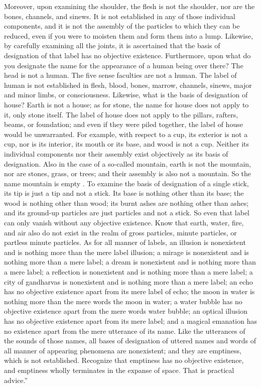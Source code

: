 \documentclass[a4paper,11pt,twoside,final]{book}
\begin{document}
Moreover, upon examining the shoulder, the flesh is not the shoulder,
nor are the bones, channels, and sinews. It is not established in any
of those individual components, and it is not the assembly of the
particles to which they can be reduced, even if you were to moisten
them and form them into a lump. Likewise, by carefully examining all
the joints, it is ascertained that the basis of designation of that
label has no objective existence.  Furthermore, upon what do you
designate the name for the appearance of a human being over there? The
head is not a human. The five sense faculties are not a human. The
label of human is not established in flesh, blood, bones, marrow,
channels, sinews, major and minor limbs, or consciousness. Likewise,
what is the basis of designation of house? Earth is not a house; as
for stone, the name for house does not apply to it, only stone
itself. The label of house does not apply to the pillars, rafters,
beams, or foundation; and even if they were piled together, the label
of house would be unwarranted. For example, with respect to a cup, its
exterior is not a cup, nor is its interior, its mouth or its base, and
wood is not a cup. Neither its individual components nor their
assembly exist objectively as its basis of designation. Also in the
case of a so-called mountain, earth is not the mountain, nor are
stones, grass, or trees; and their assembly is also not a mountain. So
the name mountain is empty .  To examine the basis of designation of a
single stick, its tip is just a tip and not a stick. Its base is
nothing other than its base; the wood is nothing other than wood; its
burnt ashes are nothing other than ashes; and its ground-up particles
are just particles and not a stick. So even that label can only vanish
without any objective existence.  Know that earth, water, fire, and
air also do not exist in the realm of gross particles, minute
particles, or partless minute particles. As for all manner of labels,
an illusion is nonexistent and is nothing more than the mere label
illusion; a mirage is nonexistent and is nothing more than a mere
label; a dream is nonexistent and is nothing more than a mere label; a
reflection is nonexistent and is nothing more than a mere label; a
city of gandharvas is nonexistent and is nothing more than a mere
label; an echo has no objective existence apart from its mere label of
echo; the moon in water is nothing more than the mere words the moon
in water; a water bubble has no objective existence apart from the
mere words water bubble; an optical illusion has no objective
existence apart from its mere label; and a magical emanation has no
existence apart from the mere utterance of its name. Like the
utterances of the sounds of those names, all bases of designation of
uttered names and words of all manner of appearing phenomena are
nonexistent; and they are emptiness, which is not
established. Recognize that emptiness has no objective existence, and
emptiness wholly terminates in the expanse of space. That is practical
advice.''
\end{document}
